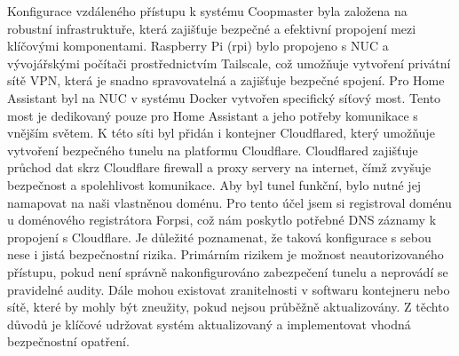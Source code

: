 Konfigurace vzdáleného přístupu k systému Coopmaster byla založena na robustní infrastruktuře, která zajišťuje bezpečné a efektivní propojení mezi klíčovými komponentami.
Raspberry Pi (rpi) bylo propojeno s NUC a vývojářskými počítači prostřednictvím Tailscale, což umožňuje vytvoření privátní sítě VPN, která je snadno spravovatelná a zajišťuje bezpečné spojení.
\newline
Pro Home Assistant byl na NUC v systému Docker vytvořen specifický síťový most.
Tento most je dedikovaný pouze pro Home Assistant a jeho potřeby komunikace s vnějším světem.
K této síti byl přidán i kontejner Cloudflared, který umožňuje vytvoření bezpečného tunelu na platformu Cloudflare.
Cloudflared zajišťuje průchod dat skrz Cloudflare firewall a proxy servery na internet, čímž zvyšuje bezpečnost a spolehlivost komunikace.
\newline
Aby byl tunel funkční, bylo nutné jej namapovat na naši vlastněnou doménu.
Pro tento účel jsem si registroval doménu u doménového registrátora Forpsi, což nám poskytlo potřebné DNS záznamy k propojení s Cloudflare.
\newline
Je důležité poznamenat, že taková konfigurace s sebou nese i jistá bezpečnostní rizika.
Primárním rizikem je možnost neautorizovaného přístupu, pokud není správně nakonfigurováno zabezpečení tunelu a neprovádí se pravidelné audity.
Dále mohou existovat zranitelnosti v softwaru kontejneru nebo sítě, které by mohly být zneužity, pokud nejsou průběžně aktualizovány.
Z těchto důvodů je klíčové udržovat systém aktualizovaný a implementovat vhodná bezpečnostní opatření.

\newpage

